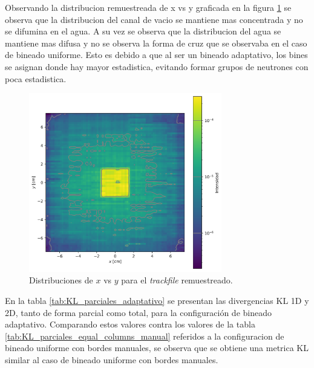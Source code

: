 Observando la distribucion remuestreada de x vs y  graficada en la figura \ref{fig:trackfile1_x_y_uniforme_adaptativo} se observa que la distribucion del canal de vacio se mantiene mas concentrada y no se difumina en el agua. A su vez se observa que la distribucion del agua se mantiene mas difusa y no se observa la forma de cruz que se observaba en el caso de bineado uniforme. Esto es debido a que al ser un bineado adaptativo, los bines se asignan donde hay mayor estadistica, evitando formar grupos de neutrones con poca estadistica.

\begin{figure}[H]
    \centering
    \includegraphics[width=0.75\textwidth]{figs/fig4_12.png}
    \caption{Distribuciones de $x$ vs $y$ para el \emph{trackfile} remuestreado.}
    \label{fig:trackfile1_x_y_uniforme_adaptativo}
\end{figure}

En la tabla \ref{tab:KL_parciales_adaptativo} se presentan las divergencias KL 1D y 2D, tanto de forma parcial como total, para la configuración de bineado adaptativo. Comparando estos valores contra los valores de la tabla \ref{tab:KL_parciales_equal_columns_manual} referidos a la configuracion de bineado uniforme con bordes manuales, se observa que se obtiene una metrica KL similar al caso de bineado uniforme con bordes manuales. 

